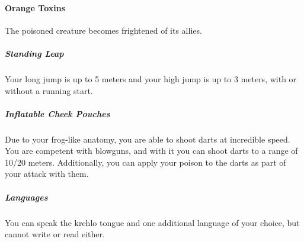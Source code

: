         \paragraph{Orange Toxins} The poisoned creature becomes frightened of its allies.

    \subparagraph{Standing Leap} Your long jump is up to 5 meters and your high jump is up to 3 meters, with or without a running start.


    \subparagraph{Inflatable Cheek Pouches} Due to your frog-like anatomy, you are able to shoot darts at incredible speed.
    You are competent with blowguns, and with it you can shoot darts to a range of 10/20 meters.
    Additionally, you can apply your poison to the darts as part of your attack with them.


    \subparagraph{Languages} You can speak the krehlo tongue and one additional language of your choice, but cannot write or read either.


\newpage

